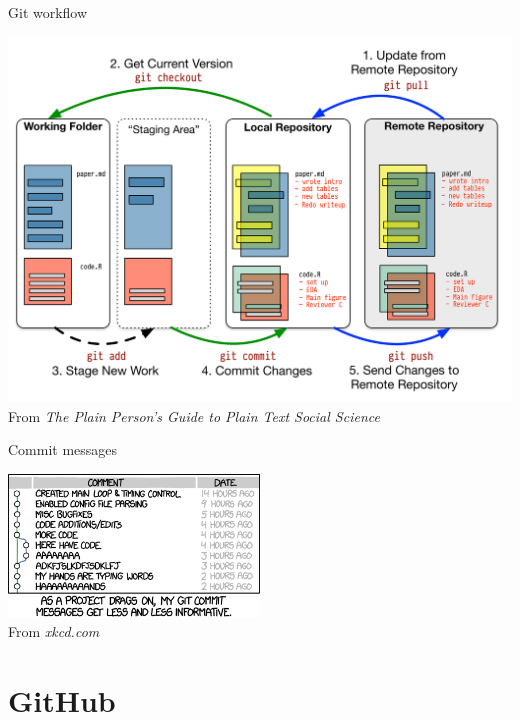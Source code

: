 \begin{frame}{Git workflow}
    \begin{center}
        \includegraphics[height=0.8\textheight]{figures/git_workflow} \\
        {\scriptsize%
         From \textit{The Plain Person's Guide to Plain Text Social Science}}
    \end{center}
\end{frame}

\begin{frame}{Commit messages}
    \begin{center}
        \includegraphics[width=0.5\textwidth]{figures/git_commit} \\[\bigskipamount]
        {\scriptsize%
         From \textit{xkcd.com}}
    \end{center}
\end{frame}

\section{GitHub}


